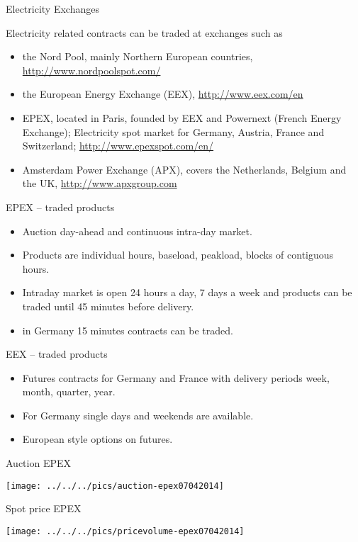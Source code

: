 {Electricity Exchanges}

Electricity related contracts  can be traded at exchanges such as
\begin{itemize}
\item<1-> the Nord Pool, mainly Northern European countries, \url{http://www.nordpoolspot.com/}
\item<2-> the European Energy Exchange (EEX), \url{http://www.eex.com/en}
\item<3-> EPEX, located in Paris, founded by EEX and Powernext (French Energy Exchange);
Electricity spot market for Germany, Austria, France and Switzerland;
\url{http://www.epexspot.com/en/}
\item<4-> Amsterdam Power Exchange (APX), covers the Netherlands, Belgium and the UK, \url{http://www.apxgroup.com}
\end{itemize}

{EPEX -- traded products}
\begin{itemize}
\item<1-> Auction day-ahead and continuous intra-day market.
\item<2-> Products are individual hours, baseload, peakload, blocks of contiguous hours.
\item<3-> Intraday market is open 24 hours a day, 7 days a week and products can be traded until 45 minutes before delivery.
\item<4-> in Germany 15 minutes contracts can be traded.
\end{itemize}

{EEX -- traded products}
\begin{itemize}
\item<1-> Futures contracts for Germany and France with delivery periods week, month, quarter, year.
\item<2-> For Germany single days and weekends are available.
\item<3-> European style options on futures.
\end{itemize}

{Auction EPEX}
\begin{center}
\texttt{[image: ../../../pics/auction-epex07042014]}
\end{center}

{Spot price EPEX}
\begin{center}
\texttt{[image: ../../../pics/pricevolume-epex07042014]}
\end{center}

